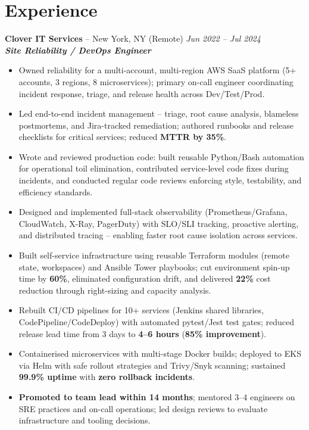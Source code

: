\documentclass[10pt,a4paper]{article}
\newcommand{\jobentry}[4]{%
  \Needspace{3\baselineskip}%
  \textbf{#1} -- #2 \hfill \textit{#3}\\[-0.15em]
  \textit{#4}\\[-0.25em]
}
\begin{document}
\section*{Experience}
\jobentry{Clover IT Services}{New York, NY (Remote)}{Jun 2022 -- Jul 2024}{\textbf{\textit{Site Reliability / DevOps Engineer}}}
\begin{itemize}
  \item Owned reliability for a multi-account, multi-region AWS SaaS platform (5+ accounts, 3 regions, 8 microservices); primary on-call engineer coordinating incident response, triage, and release health across Dev/Test/Prod.
  \item Led end-to-end incident management -- triage, root cause analysis, blameless postmortems, and Jira-tracked remediation; authored runbooks and release checklists for critical services; reduced \textbf{MTTR by 35\%}.
  \item Wrote and reviewed production code: built reusable Python/Bash automation for operational toil elimination, contributed service-level code fixes during incidents, and conducted regular code reviews enforcing style, testability, and efficiency standards.
  \item Designed and implemented full-stack observability (Prometheus/Grafana, CloudWatch, X-Ray, PagerDuty) with SLO/SLI tracking, proactive alerting, and distributed tracing -- enabling faster root cause isolation across services.
  \item Built self-service infrastructure using reusable Terraform modules (remote state, workspaces) and Ansible Tower playbooks; cut environment spin-up time by \textbf{60\%}, eliminated configuration drift, and delivered \textbf{22\%} cost reduction through right-sizing and capacity analysis.
  \item Rebuilt CI/CD pipelines for 10+ services (Jenkins shared libraries, CodePipeline/CodeDeploy) with automated pytest/Jest test gates; reduced release lead time from 3 days to \textbf{4--6 hours} (\textbf{85\% improvement}).
  \item Containerised microservices with multi-stage Docker builds; deployed to EKS via Helm with safe rollout strategies and Trivy/Snyk scanning; sustained \textbf{99.9\% uptime} with \textbf{zero rollback incidents}.
  \item \textbf{Promoted to team lead within 14 months}; mentored 3--4 engineers on SRE practices and on-call operations; led design reviews to evaluate infrastructure and tooling decisions.
\end{itemize}
\end{document}
